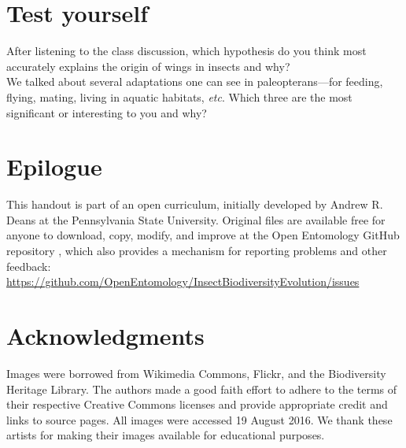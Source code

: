 \documentclass[letterpaper, 11pt]{article}
\begin{document}
\FloatBarrier
\section*{Test yourself}
\noindent{}After listening to the class discussion, which hypothesis do you think most accurately explains the origin of wings in insects and why?\\

\noindent{}We talked about several adaptations one can see in paleopterans---for feeding, flying, mating, living in aquatic habitats, \textit{etc}. Which three are the most significant or interesting to you and why?\\

\clearpage
\section*{Epilogue}
This handout is part of an open curriculum, initially developed by Andrew R. Deans at the Pennsylvania State University. Original files are available free for anyone to download, copy, modify, and improve at the Open Entomology GitHub repository \citep{ENT532}, which also provides a mechanism for reporting problems and other feedback:\\
\url{https://github.com/OpenEntomology/InsectBiodiversityEvolution/issues}

\section*{Acknowledgments}
Images were borrowed from Wikimedia Commons, Flickr, and the Biodiversity Heritage Library. The authors made a good faith effort to adhere to the terms of their respective Creative Commons licenses and provide appropriate credit and links to source pages. All images were accessed 19 August 2016. We thank these artists for making their images available for educational purposes.

\FloatBarrier


\end{document}
